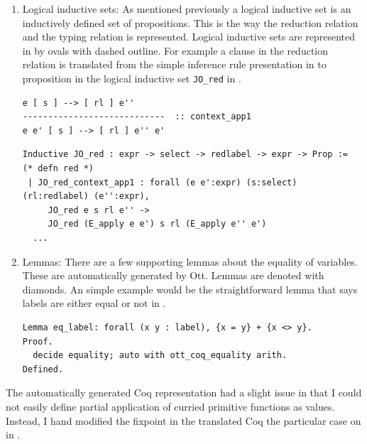 \documentclass[12pt,twoside,notitlepage]{report}
\begin{document}
\begin{enumerate}
{\begin{minipage}{\linewidth}
\end{minipage}	
}
\item{Logical inductive sets: As mentioned previously a logical inductive set is an inductively defined set of propositions. This is the way the reduction relation and the typing relation is represented. Logical inductive sets are represented in  by ovals with dashed outline. For example a clause in the reduction relation is translated from the simple inference rule presentation in  to proposition in the logical inductive set \verb|JO_red| in .


\begin{lstlisting}[language={Ott}, caption={Ott reduction relation example}, label={lst:ottcontextapp1}]
e [ s ] --> [ rl ] e''
----------------------------  :: context_app1
e e' [ s ] --> [ rl ] e'' e'
\end{lstlisting}


\begin{minipage}{\linewidth}

\begin{lstlisting}[language={Coq},caption={Coq reduction relation example}, label={lst:coqlogind}]
Inductive JO_red : expr -> select -> redlabel -> expr -> Prop :=    (* defn red *)
 | JO_red_context_app1 : forall (e e':expr) (s:select) (rl:redlabel) (e'':expr),
     JO_red e s rl e'' ->
     JO_red (E_apply e e') s rl (E_apply e'' e')
  ...
\end{lstlisting}

\end{minipage}	
}
\item{Lemmas: There are a few supporting lemmas about the equality of variables. These are automatically generated by Ott. Lemmas are denoted with diamonds. An simple example would be the straightforward lemma that says labels are either equal or not in .

\begin{minipage}{\linewidth}

\begin{lstlisting}[language={Coq},caption={Coq label equality lemma}, label={lst:coqeqlabel}]
Lemma eq_label: forall (x y : label), {x = y} + {x <> y}.
Proof.
  decide equality; auto with ott_coq_equality arith.
Defined.
\end{lstlisting}

\end{minipage}	

}
\end{enumerate} 
The automatically generated Coq representation had a slight issue in that I could not easily define partial application of curried primitive functions as values. Instead, I hand modified the fixpoint in the translated Coq the particular case on  in .
\end{document}
